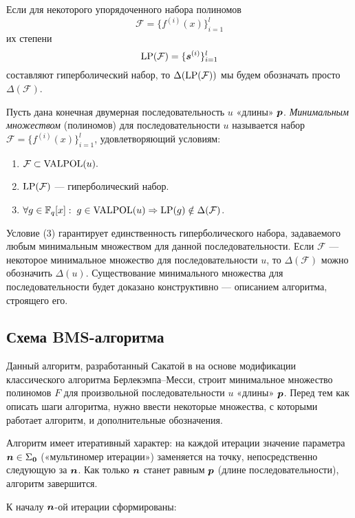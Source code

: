 \documentclass[14pt]{extarticle}
\begin{document}
Если для некоторого упорядоченного набора полиномов
$$\mathcal{F}=\{f^{(i)}(x)\}_{i=1}^l$$ их степени $$\operatorname{LP}(\mathcal F) =
\{\boldsymbol{s}^{(i)}\}_{i=1}^l$$ составляют гиперболический набор, то
$\Delta(\operatorname{LP}(\mathcal F))$ мы будем обозначать просто
$\Delta(\mathcal{F})$.

Пусть дана конечная двумерная последовательность $u$ «длины» $\boldsymbol{p}$. {\em Минимальным множеством} (полиномов) для последовательности
$u$ называется набор $\mathcal{F}=\{f^{(i)}(x)\}_{i=1}^l$,
удовлетворяющий условиям:
\begin{enumerate}
   \item $\mathcal{F}\subset\operatorname{VALPOL}(u).$
   \item $\operatorname{LP}(\mathcal{F})$ --- гиперболический набор.
   \item $\forall g\in\mathbb F_q[x]:
      \;g\in\operatorname{VALPOL}(u)\Rightarrow\operatorname{LP}(g)\notin\Delta(\mathcal{F})$.
\end{enumerate}

Условие (3) гарантирует единственность гиперболического набора,
задаваемого любым минимальным множеством для данной
последовательности. Если $\mathcal F$ — некоторое минимальное
множество  для последовательности $u$, то $\Delta(\mathcal F)$ можно
обозначить $\Delta(u)$. Существование минимального множества для
последовательности будет доказано конструктивно — описанием
алгоритма, строящего его.


\subsection{Схема BMS-алгоритма}\label{BMS}

Данный алгоритм, разработанный Сакатой в \cite{Sakata88} на основе
модификации классического алгоритма Берлекэмпа--Месси, строит
минимальное множество полиномов $F$ для произвольной
последовательности $u$ «длины» $\boldsymbol{p}$. Перед тем как описать шаги
алгоритма, нужно ввести некоторые множества, с которыми работает
алгоритм, и дополнительные обозначения.

Алгоритм имеет итеративный характер: на каждой итерации значение параметра $\boldsymbol{n}\in\Sigma_{\boldsymbol{0}}$ («мультиномер итерации») заменяется на точку, непосредственно
следующую за $\boldsymbol{n}$. Как только $\boldsymbol{n}$ станет равным $\boldsymbol{p}$ (длине
последовательности), алгоритм завершится.

К началу $\boldsymbol{n}$-ой итерации
сформированы:
\end{document}
